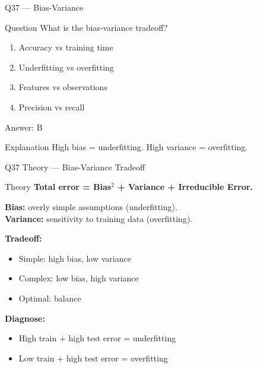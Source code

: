 \documentclass[aspectratio=169,8pt]{beamer}
\begin{document}
	\begin{frame}{Q37 --- Bias-Variance}
		\begin{block}{Question}
			What is the bias-variance tradeoff?
		\end{block}
		\begin{enumerate}[label=\Alph*.]
			\item Accuracy vs training time
			\item Underfitting vs overfitting
			\item Features vs observations
			\item Precision vs recall
		\end{enumerate}
		\begin{exampleblock}{Answer: B}
		\end{exampleblock}
		\begin{block}{Explanation}
			High bias = underfitting. High variance = overfitting.
		\end{block}
	\end{frame}
	
	\begin{frame}{Q37 Theory --- Bias-Variance Tradeoff}
		\begin{block}{Theory}
			\textbf{Total error = Bias$^2$ + Variance + Irreducible Error.}
			\vspace{2mm}
			
			\textbf{Bias:} overly simple assumptions (underfitting).\\
			\textbf{Variance:} sensitivity to training data (overfitting).
			\vspace{2mm}
			
			\textbf{Tradeoff:}
			\begin{itemize}
				\item Simple: high bias, low variance
				\item Complex: low bias, high variance
				\item Optimal: balance
			\end{itemize}
			\textbf{Diagnose:}
			\begin{itemize}
				\item High train + high test error = underfitting
				\item Low train + high test error = overfitting
			\end{itemize}
		\end{block}
	\end{frame}
	
\end{document}
